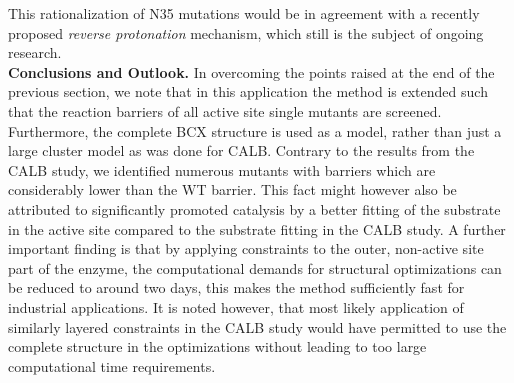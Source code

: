 This rationalization of N35 mutations would be in agreement with a recently proposed \textit{reverse protonation} mechanism\cite{joshi2000hydrogen}, which still is the subject of ongoing research.\\
\textbf{Conclusions and Outlook.}
In overcoming the points raised at the end of the previous section, we note that in this application the method is extended such that the reaction barriers of all active site single mutants are screened.
Furthermore, the complete BCX structure is used as a model, rather than just  a large cluster model as was done for CALB.
Contrary to the results from the CALB study, we identified numerous mutants with barriers which are considerably lower than the WT barrier.
This fact might however also be attributed to significantly promoted catalysis by a better fitting of the substrate in the active site compared to the substrate fitting in the CALB study.
A further important finding is that by applying constraints to the outer, non-active site part of the enzyme, the computational demands for structural optimizations can be reduced to around two days, this makes the method sufficiently fast for industrial applications.
It is noted however, that most likely application of similarly layered constraints in the CALB study would have permitted to use the complete structure in the optimizations without leading to too large computational time requirements.




